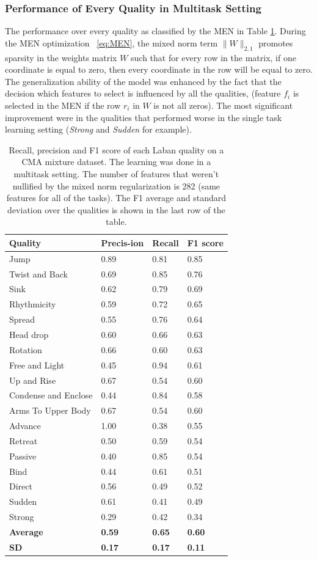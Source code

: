 \documentclass[11pt,twocolumn,varwidth=true,a4paper,fleqn]{article}
\begin{document}
\subsubsection{Performance of Every Quality in Multitask Setting}
The performance over every quality as classified by the MEN in Table
\ref{mixedSummary}. During the MEN optimization ~\eqref{eq:MEN}, the mixed norm 
term $\|W\|_{2,1}$  promotes sparsity in the weights matrix $W$ such that for 
every row in the matrix, if one coordinate is equal to zero, then every coordinate 
in the row will be equal to zero.
\\The generalization ability of the model was enhanced by the fact that the
decision which features to select is influenced by all the qualities, (feature $f_i$ is 
selected in the MEN if the row $r_i$ in $W$ is not all zeros). The most
significant improvement were in the qualities that performed worse in the
single task learning setting (\textit{Strong} and \textit{Sudden} for example).
\begin{table}[!h]
	  	\centering
		\begin{tabular}{|p{3cm}|p{0.9cm}|p{0.9cm}|p{0.9cm}|}
		\hline
		Quality&Precis-ion&Recall&F1 score\\\hline
		Jump&0.89&0.81&0.85\\\hline
		Twist and Back&0.69&0.85&0.76\\\hline
		Sink&0.62&0.79&0.69\\\hline
		Rhythmicity&0.59&0.72&0.65\\\hline
		Spread&0.55&0.76&0.64\\\hline
		Head drop&0.60&0.66&0.63\\\hline
		Rotation&0.66&0.60&0.63\\\hline
		Free and Light&0.45&0.94&0.61\\\hline
		Up and Rise&0.67&0.54&0.60\\\hline
		Condense and Enclose&0.44&0.84&0.58\\\hline
		Arms To Upper Body&0.67&0.54&0.60\\\hline
		Advance&1.00&0.38&0.55\\\hline
		Retreat&0.50&0.59&0.54\\\hline
		Passive&0.40&0.85&0.54\\\hline
		Bind&0.44&0.61&0.51\\\hline
		Direct&0.56&0.49&0.52\\\hline
		Sudden&0.61&0.41&0.49\\\hline
		Strong&0.29&0.42&0.34\\\hline
		\textbf{Average}&\textbf{0.59}&\textbf{0.65}&\textbf{0.60}\\\hline
		\textbf{SD}&\textbf{0.17}&\textbf{0.17}&\textbf{0.11}\\\hline
		\end{tabular}
		\caption{Recall, precision and F1 score of each Laban quality on a CMA
		   mixture dataset. The learning was done in a multitask setting. The number of
		   features that weren't nullified by the mixed norm regularization is
		   282 (same features for all of the tasks). The F1 average and standard
		   deviation over the qualities is shown in the last row of the table.}
	   \label{mixedSummary}
	\end{table}
\end{document}
